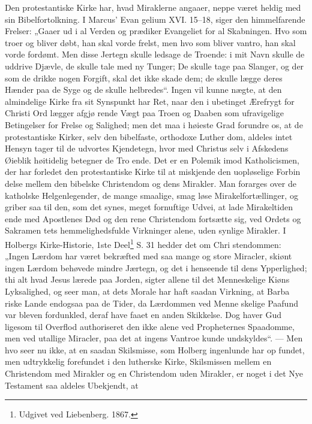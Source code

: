 \documentclass[12pt,a4paper]{article}
\newcommand{\opage}[1]{\marginnote{\footnotesize\textit{[#1]}}}
\begin{document}
\opage{14}Den protestantiske Kirke har, hvad Miraklerne angaaer,
neppe været heldig med sin Bibelfortolkning. I Marcus' Evan\-%
gelium XVI. 15--18, siger den himmelfarende Frelser: „Gaaer
ud i al Verden og prædiker Evangeliet for al Skabningen. Hvo
som troer og bliver døbt, han skal vorde frelst, men hvo som
bliver vantro, han skal vorde fordømt. Men disse Jertegn skulle
ledsage de Troende: i mit Navn skulle de uddrive Djævle, de
skulle tale med ny Tunger; De skulle tage paa Slanger, og der\-%
som de drikke nogen Forgift, skal det ikke skade dem; de skulle
lægge deres Hænder paa de Syge og de skulle helbredes“. Ingen
vil kunne nægte, at den almindelige Kirke fra sit Synspunkt har
Ret, naar den i ubetinget Ærefrygt for Christi Ord lægger afgjø\-%
rende Vægt paa Troen og Daaben som ufravigelige Betingelser
for Frelse og Salighed; men det maa i høieste Grad forundre os,
at de protestantiske Kirker, selv den bibelfaste, orthodoxe Luther\-%
dom, aldeles intet Hensyn tager til de udvortes Kjendetegn, hvor\-%
med Christus selv i Afskedens Øieblik høitidelig betegner de Tro\-%
ende. Det er en Polemik imod Katholicismen, der har forledet
den protestantiske Kirke til at miskjende den uopløselige Forbin\-%
delse mellem den bibelske Christendom og dens Mirakler. Man
forarges over de katholske Helgenlegender, de mange smaalige, smag\-%
løse Mirakelfortællinger, og griber saa til den, som det synes, meget
fornuftige Udvei, at lade Mirakeltiden ende med Apostlenes Død
og den rene Christendom fortsætte sig, ved Ordets og Sakramen\-%
tets hemmelighedsfulde Virkninger alene, uden synlige Mirakler.
I Holbergs Kirke-Historie, 1ste Deel\footnote{Udgivet ved Liebenberg. 1867.} %
S. 31 hedder det om Chri\-%
stendommen: „Ingen Lærdom har været bekræfted med saa mange
og store Miracler, skiønt ingen Lærdom behøvede mindre Jærtegn,
og det i henseende til dens Ypperlighed; thi alt hvad Jesus lærede
paa Jorden, sigter allene til det Menneskelige Kiøns Lyksalighed,
og seer man, at dets Morale har haft saadan Virkning, at Barba\-%
riske Lande endogsaa paa de Tider, da Lærdommen ved Menne\-%
skelige Paafund var bleven fordunkled, deraf have faaet en anden
\opage{15}Skikkelse. Dog haver Gud ligesom til Overflod authoriseret den
ikke alene ved Propheternes Spaadomme, men ved utallige Miracler,
paa det at ingens Vantroe kunde undskyldes“. --- Men hvo seer nu
ikke, at en saadan Skilsmisse, som Holberg ingenlunde har op\-%
fundet, men udtrykkelig forefundet i den lutherske Kirke, Skilsmissen
mellem en Christendom med Mirakler og en Christendom uden
Mirakler, er noget i det Nye Testament saa aldeles Ubekjendt, at
\end{document}
